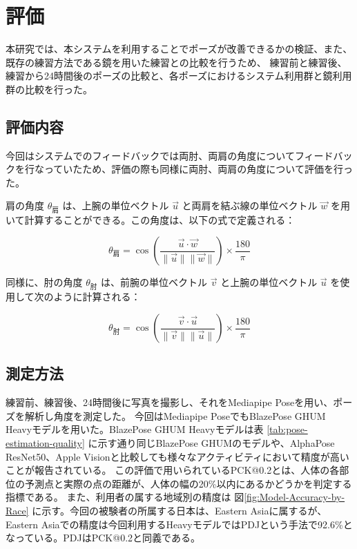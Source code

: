 \chapter{評価}

\label{evaluation}
本研究では、本システムを利用することでポーズが改善できるかの検証、また、既存の練習方法である鏡を用いた練習との比較を行うため、
練習前と練習後、練習から24時間後のポーズの比較と、各ポーズにおけるシステム利用群と鏡利用群の比較を行った。
\section{評価内容}
  今回はシステムでのフィードバックでは両肘、両肩の角度についてフィードバックを行なっていたため、評価の際も同様に両肘、両肩の角度について評価を行った。


  肩の角度 \(\theta_{\text{肩}}\) は、上腕の単位ベクトル \(\vec{u}\) と両肩を結ぶ線の単位ベクトル \(\vec{w}\) を用いて計算することができる。この角度は、以下の式で定義される：

  \[
  \theta_{\text{肩}} = \cos\left( \frac{\vec{u} \cdot \vec{w}}{\|\vec{u}\| \|\vec{w}\|} \right) \times \frac{180}{\pi}
  \]


  同様に、肘の角度 \(\theta_{\text{肘}}\) は、前腕の単位ベクトル \(\vec{v}\) と上腕の単位ベクトル \(\vec{u}\) を使用して次のように計算される：

  \[
  \theta_{\text{肘}} = \cos\left( \frac{\vec{v} \cdot \vec{u}}{\|\vec{v}\| \|\vec{u}\|} \right) \times \frac{180}{\pi}
  \]

\section{測定方法}
  練習前、練習後、24時間後に写真を撮影し、それをMediapipe Poseを用い、ポーズを解析し角度を測定した。
  今回はMediapipe PoseでもBlazePose GHUM Heavyモデルを用いた。BlazePose GHUM Heavyモデルは表 \ref{tab:pose-estimation-quality} に示す通り同じBlazePose GHUMのモデルや、AlphaPose ResNet50、Apple Visionと比較しても様々なアクティビティにおいて精度が高いことが報告されている。
  この評価で用いられているPCK@0.2とは、人体の各部位の予測点と実際の点の距離が、人体の幅の20\%以内にあるかどうかを判定する指標である。\cite{PCK} また、利用者の属する地域別の精度は 図\ref{fig:Model-Accuracy-by-Race} に示す。今回の被験者の所属する日本は、Eastern Asiaに属するが、Eastern Asiaでの精度は今回利用するHeavyモデルではPDJという手法で92.6\%となっている。PDJはPCK@0.2と同義である。

